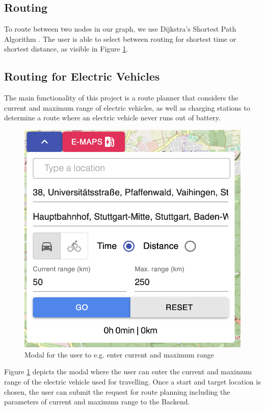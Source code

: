 \documentclass[a4paper]{article}
\begin{document}
\subsection{Routing}
To route between two nodes in our graph, we use Dijkstra's Shortest Path Algorithm \cite{Dijkstra1959}.
The user is able to select between routing for shortest time or shortest distance, as visible in Figure \ref{fig:input}.
\subsection{Routing for Electric Vehicles}
The main functionality of this project is a route planner that considers the current and maximum range of electric vehicles, as well as charging stations to determine a route where an electric vehicle never runs out of battery.
\begin{figure}[h]
    \centering
    \includegraphics[scale=0.6]{figures/input}
    \caption{Modal for the user to e.g. enter current and maximum range}
    \label{fig:input}
\end{figure}
Figure \ref{fig:input} depicts the modal where the user can enter the current and maximum range of the electric vehicle used for travelling.
Once a start and target location is chosen, the user can submit the request for route planning including the parameters of current and maximum range to the Backend.
\end{document}
